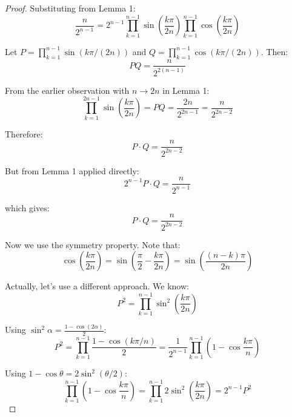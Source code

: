 \documentclass{article}
\begin{document}
\begin{proof}
Substituting from Lemma 1:
\begin{equation}
\frac{n}{2^{n-1}} = 2^{n-1}\prod_{k=1}^{n-1}\sin\left(\frac{k\pi}{2n}\right)\prod_{k=1}^{n-1}\cos\left(\frac{k\pi}{2n}\right)
\end{equation}

Let $P = \prod_{k=1}^{n-1}\sin(k\pi/(2n))$ and $Q = \prod_{k=1}^{n-1}\cos(k\pi/(2n))$. Then:
\begin{equation}
PQ = \frac{n}{2^{2(n-1)}}
\end{equation}

From the earlier observation with $n \to 2n$ in Lemma 1:
\begin{equation}
\prod_{k=1}^{2n-1}\sin\left(\frac{k\pi}{2n}\right) = PQ = \frac{2n}{2^{2n-1}} = \frac{n}{2^{2n-2}}
\end{equation}

Therefore:
\begin{equation}
P \cdot Q = \frac{n}{2^{2n-2}}
\end{equation}

But from Lemma 1 applied directly:
\begin{equation}
2^{n-1}P \cdot Q = \frac{n}{2^{n-1}}
\end{equation}

which gives:
\begin{equation}
P \cdot Q = \frac{n}{2^{2n-2}}
\end{equation}

Now we use the symmetry property. Note that:
\begin{equation}
\cos\left(\frac{k\pi}{2n}\right) = \sin\left(\frac{\pi}{2} - \frac{k\pi}{2n}\right) = \sin\left(\frac{(n-k)\pi}{2n}\right)
\end{equation}

Actually, let's use a different approach. We know:
\begin{equation}
P^2 = \prod_{k=1}^{n-1}\sin^2\left(\frac{k\pi}{2n}\right)
\end{equation}

Using $\sin^2\alpha = \frac{1-\cos(2\alpha)}{2}$:
\begin{equation}
P^2 = \prod_{k=1}^{n-1}\frac{1-\cos(k\pi/n)}{2} = \frac{1}{2^{n-1}}\prod_{k=1}^{n-1}\left(1-\cos\frac{k\pi}{n}\right)
\end{equation}

Using $1-\cos\theta = 2\sin^2(\theta/2)$:
\begin{equation}
\prod_{k=1}^{n-1}\left(1-\cos\frac{k\pi}{n}\right) = \prod_{k=1}^{n-1}2\sin^2\left(\frac{k\pi}{2n}\right) = 2^{n-1}P^2
\end{equation}


\end{proof}
\end{document}
